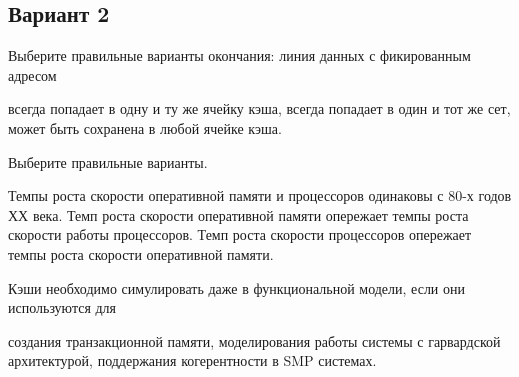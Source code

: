 \subsection*{Вариант 2}
\begin{questions}

\question[3] Выберите правильные варианты окончания: линия данных с фикированным адресом
\begin{choices}
    \choice всегда попадает в одну и ту же ячейку кэша,
    \correctchoice всегда попадает в один и тот же сет,
    \choice может быть сохранена в любой ячейке кэша.
\end{choices}

    \question[3] Выберите правильные варианты.
    \begin{choices}
        \choice Темпы роста скорости оперативной памяти и процессоров одинаковы с 80-х годов ХХ века.
        \choice Темп роста скорости оперативной памяти опережает темпы роста скорости работы процессоров.
        \correctchoice Темп роста скорости процессоров опережает темпы роста скорости оперативной памяти. 
    \end{choices}

\question[3] Кэши необходимо симулировать даже в функциональной модели, если они используются для
\begin{choices}
    \correctchoice создания транзакционной памяти,
    \choice моделирования работы системы с гарвардской архитектурой,
    \choice поддержания когерентности в SMP системах.
\end{choices}





\end{questions}

